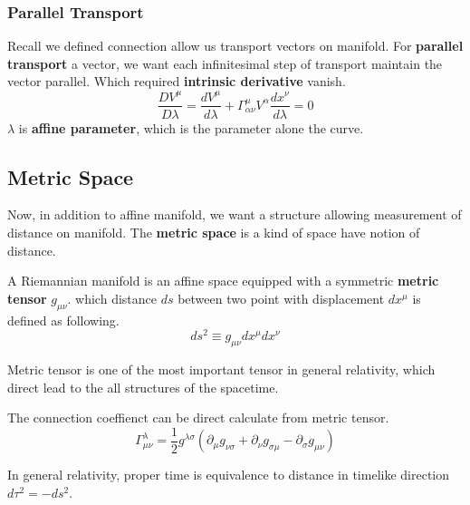 \documentclass[12pt]{article}
\theoremstyle{mystyle}{\newtheorem{definition}{Definition}[section]}
\theoremstyle{mystyle}{\newtheorem{theorem}[definition]{Theorem}}
\theoremstyle{mystyle}{\newtheorem*{remark}{Remark}}
\theoremstyle{mystyle}{\newtheorem*{example}{Example}}
\theoremstyle{mystyle}{\newtheorem*{examples}{Examples}}
\theoremstyle{cstyle}{\newtheorem*{cthm}{}}
\begin{document}
\subsubsection{Parallel Transport}
Recall we defined connection allow us transport vectors on manifold.
For \textbf{parallel transport} a vector, we want each infinitesimal step of transport maintain the vector parallel.
Which required \textbf{intrinsic derivative} vanish.\[\frac{DV^{\mu}}{D\lambda} =
  \frac{dV^{\mu}}{d\lambda}+ \Gamma^{\mu}_{\alpha\nu}V^{\alpha}\frac{dx^{\nu}}{d\lambda} = 0\]
\(\lambda\) is \textbf{affine parameter}, which is the parameter alone the curve.

\subsection{Metric Space}
Now, in addition to affine manifold, we want a structure allowing measurement of distance on manifold.
The \textbf{metric space} is a kind of space have notion of distance.
\begin{definition}
  A Riemannian manifold is an affine space equipped with a symmetric \textbf{metric tensor} \(g_{\mu\nu}\).
  which distance \(ds\) between two point with displacement \(dx^{\mu}\) is defined as following.
  \[ds^2 \equiv g_{\mu \nu} dx^{\mu} dx^{\nu}\]
\end{definition}
Metric tensor is one of the most important tensor in general relativity,
which direct lead to the all structures of the spacetime.
\begin{example}
  The connection coeffienct can be direct calculate from metric tensor.
  \[\Gamma_{\mu\nu}^{\lambda} = \frac{1}{2}g^{\lambda\sigma}(\partial_{\mu}g_{\nu\sigma}+ \partial_{\nu}g_{\sigma\mu}
    - \partial_{\sigma}g_{\mu\nu})\]
\end{example}
In general relativity, proper time is equivalence to distance in timelike direction \(d\tau^2 = - ds^2\).
\end{document}
